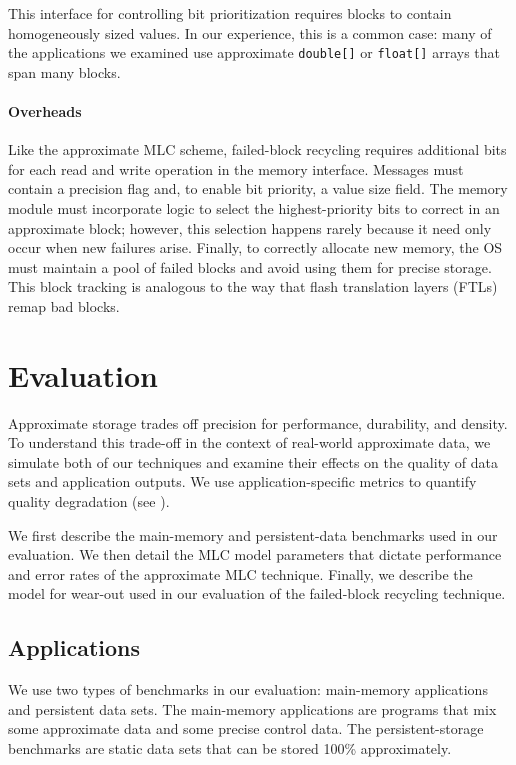 This interface for controlling bit prioritization requires blocks to contain
homogeneously sized values. In our experience, this is a common case: many of
the applications we examined use approximate
\texttt{double[]} or \texttt{float[]} arrays that span many blocks.

\paragraph{Overheads}

Like the approximate MLC scheme, failed-block recycling requires additional
bits for each read and write operation in the memory interface.
Messages must contain a precision flag and, to enable bit priority, a value
size field.
The memory module must incorporate logic to select the highest-priority bits
to correct in an approximate block; however, this selection happens rarely
because it need only occur when new failures arise.
Finally, to correctly allocate new memory, the OS must maintain a pool of
failed blocks and avoid using them for precise storage.
This block tracking is analogous to the way that flash translation
layers (FTLs) remap bad blocks.


\section{Evaluation}
\label{approxstorage:sec:eval}

Approximate storage trades off precision for performance, durability, and density.
To understand this trade-off in the context of real-world approximate data, we
simulate both of our techniques and examine their effects on the quality of
data sets and application outputs.
We use
application-specific metrics to quantify quality
degradation (see ).

We first describe the main-memory and persistent-data benchmarks used in our
evaluation. We then detail the MLC model parameters that dictate performance
and error rates of the approximate MLC technique. Finally, we describe the
model for wear-out used in our evaluation of the failed-block recycling
technique.

\subsection{Applications}

We use two types of benchmarks in our evaluation: main-memory applications and
persistent data sets. The main-memory applications are programs that mix some
approximate data and some precise control data.
The persistent-storage
benchmarks are static data sets that can be stored 100\% approximately.

